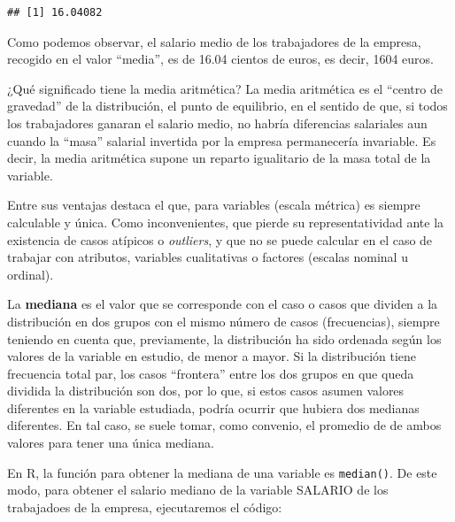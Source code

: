 \documentclass[
]{book}
\newenvironment{Shaded}{\begin{snugshade}}{\end{snugshade}}
\newcommand{\CommentTok}[1]{\textcolor[rgb]{0.56,0.35,0.01}{\textit{#1}}}
\newcommand{\FunctionTok}[1]{\textcolor[rgb]{0.13,0.29,0.53}{\textbf{#1}}}
\newcommand{\NormalTok}[1]{#1}
\newcommand{\OtherTok}[1]{\textcolor[rgb]{0.56,0.35,0.01}{#1}}
\newcommand{\SpecialCharTok}[1]{\textcolor[rgb]{0.81,0.36,0.00}{\textbf{#1}}}
\begin{document}
\begin{verbatim}
## [1] 16.04082
\end{verbatim}

Como podemos observar, el salario medio de los trabajadores de la empresa, recogido en el valor ``media'', es de 16.04 cientos de euros, es decir, 1604 euros.

¿Qué significado tiene la media aritmética?
La media aritmética es el ``centro de gravedad'' de la distribución, el punto de equilibrio, en el sentido de que, si todos los trabajadores ganaran el salario medio, no habría diferencias salariales aun cuando la ``masa'' salarial invertida por la empresa permanecería invariable.
Es decir, la media aritmética supone un reparto igualitario de la masa total de la variable.

Entre sus ventajas destaca el que, para variables (escala métrica) es siempre calculable y única.
Como inconvenientes, que pierde su representatividad ante la existencia de casos atípicos o \emph{outliers}, y que no se puede calcular en el caso de trabajar con atributos, variables cualitativas o factores (escalas nominal u ordinal).

La \textbf{mediana} es el valor que se corresponde con el caso o casos que dividen a la distribución en dos grupos con el mismo número de casos (frecuencias), siempre teniendo en cuenta que, previamente, la distribución ha sido ordenada según los valores de la variable en estudio, de menor a mayor.
Si la distribución tiene frecuencia total par, los casos ``frontera'' entre los dos grupos en que queda dividida la distribución son dos, por lo que, si estos casos asumen valores diferentes en la variable estudiada, podría ocurrir que hubiera dos medianas diferentes.
En tal caso, se suele tomar, como convenio, el promedio de de ambos valores para tener una única mediana.

En R, la función para obtener la mediana de una variable es \texttt{median()}.
De este modo, para obtener el salario mediano de la variable SALARIO de los trabajadoes de la empresa, ejecutaremos el código:

\begin{Shaded}
\end{Shaded}
\end{document}
